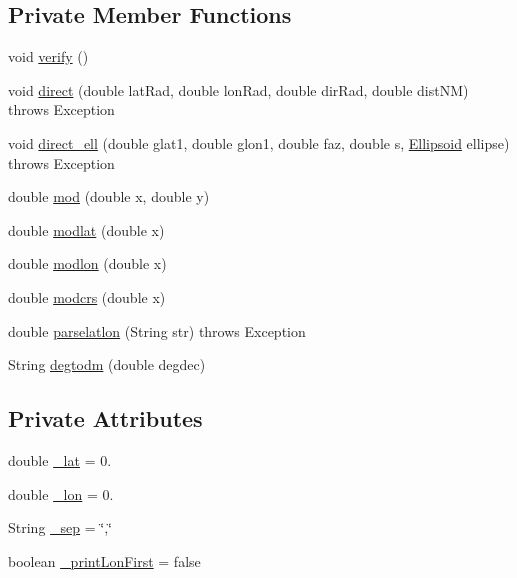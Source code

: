 \subsection*{Private Member Functions}
\begin{DoxyCompactItemize}
\item 
void \hyperlink{classpt_1_1lsts_1_1asa_1_1pos_1_1GISCoordinate_a3bdf6ec1bfaf958dab08a26d0c48056d}{verify} ()
\item 
void \hyperlink{classpt_1_1lsts_1_1asa_1_1pos_1_1GISCoordinate_a614105116d1b08323b6e0bf5d58242e5}{direct} (double lat\+Rad, double lon\+Rad, double dir\+Rad, double dist\+N\+M)  throws Exception 
\item 
void \hyperlink{classpt_1_1lsts_1_1asa_1_1pos_1_1GISCoordinate_ae89bd5e19e1d5c8e1d9e9959388be976}{direct\+\_\+ell} (double glat1, double glon1, double faz, double s, \hyperlink{classpt_1_1lsts_1_1asa_1_1pos_1_1GISCoordinate_1_1Ellipsoid}{Ellipsoid} ellipse)  throws Exception 
\item 
double \hyperlink{classpt_1_1lsts_1_1asa_1_1pos_1_1GISCoordinate_a527bee02fd6541aef0ccfb70d414e120}{mod} (double x, double y)
\item 
double \hyperlink{classpt_1_1lsts_1_1asa_1_1pos_1_1GISCoordinate_aa6578eb40848c2265bcfc5b78ca204cd}{modlat} (double x)
\item 
double \hyperlink{classpt_1_1lsts_1_1asa_1_1pos_1_1GISCoordinate_a67323a251bf3459b74ef711e88c7ee14}{modlon} (double x)
\item 
double \hyperlink{classpt_1_1lsts_1_1asa_1_1pos_1_1GISCoordinate_ac5deea5795e644970a9c27a14ea1cd2d}{modcrs} (double x)
\item 
double \hyperlink{classpt_1_1lsts_1_1asa_1_1pos_1_1GISCoordinate_afc9226705aee8eb3957e35d1e669923d}{parselatlon} (String str)  throws Exception 
\item 
String \hyperlink{classpt_1_1lsts_1_1asa_1_1pos_1_1GISCoordinate_a5b2906be67a5e654c0497b72b3a3cc36}{degtodm} (double degdec)
\end{DoxyCompactItemize}
\subsection*{Private Attributes}
\begin{DoxyCompactItemize}
\item 
double \hyperlink{classpt_1_1lsts_1_1asa_1_1pos_1_1GISCoordinate_a6d9225cd4b2465b98d5beb0b42d2cc3e}{\+\_\+lat} = 0.
\item 
double \hyperlink{classpt_1_1lsts_1_1asa_1_1pos_1_1GISCoordinate_af124301bd53ea68c0b67e9eeb2483c07}{\+\_\+lon} = 0.
\item 
String \hyperlink{classpt_1_1lsts_1_1asa_1_1pos_1_1GISCoordinate_a2fdaf8f95cf0cbfc186618d2d29a3ab0}{\+\_\+sep} = \char`\"{},\char`\"{}
\item 
boolean \hyperlink{classpt_1_1lsts_1_1asa_1_1pos_1_1GISCoordinate_af782673ce1b6b2f0031ef307c6488fda}{\+\_\+print\+Lon\+First} = false
\end{DoxyCompactItemize}
